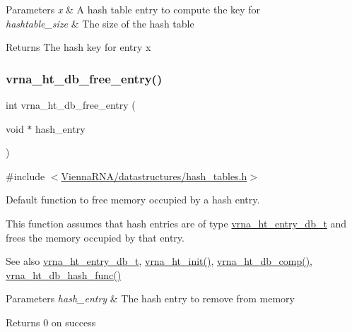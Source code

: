 \begin{DoxyParams}{Parameters}
{\em x} & A hash table entry to compute the key for \\
\hline
{\em hashtable\+\_\+size} & The size of the hash table \\
\hline
\end{DoxyParams}
\begin{DoxyReturn}{Returns}
The hash key for entry {\ttfamily x} 
\end{DoxyReturn}
\mbox{\label{group__hash__table__utils_gabcdcd0d070b3dfd2634a09e7838acf66}} 
\subsubsection{\texorpdfstring{vrna\+\_\+ht\+\_\+db\+\_\+free\+\_\+entry()}{vrna\_ht\_db\_free\_entry()}}
{\footnotesize\ttfamily int vrna\+\_\+ht\+\_\+db\+\_\+free\+\_\+entry (\begin{DoxyParamCaption}\item[{void $\ast$}]{hash\+\_\+entry }\end{DoxyParamCaption})}



{\ttfamily \#include $<$\hyperlink{hash__tables_8h}{Vienna\+R\+N\+A/datastructures/hash\+\_\+tables.\+h}$>$}



Default function to free memory occupied by a hash entry. 

This function assumes that hash entries are of type \hyperlink{group__hash__table__utils_structvrna__ht__entry__db__t}{vrna\+\_\+ht\+\_\+entry\+\_\+db\+\_\+t} and free\textquotesingle{}s the memory occupied by that entry.

\begin{DoxySeeAlso}{See also}
\hyperlink{group__hash__table__utils_structvrna__ht__entry__db__t}{vrna\+\_\+ht\+\_\+entry\+\_\+db\+\_\+t}, \hyperlink{group__hash__table__utils_ga37d1c7e13087a2b7c1b87fda34577c29}{vrna\+\_\+ht\+\_\+init()}, \hyperlink{group__hash__table__utils_gac4ec0b8372d50d7347a63f140f340962}{vrna\+\_\+ht\+\_\+db\+\_\+comp()}, \hyperlink{group__hash__table__utils_gad133721a3cd2f8ca259fe315d86035a7}{vrna\+\_\+ht\+\_\+db\+\_\+hash\+\_\+func()}
\end{DoxySeeAlso}

\begin{DoxyParams}{Parameters}
{\em hash\+\_\+entry} & The hash entry to remove from memory \\
\hline
\end{DoxyParams}
\begin{DoxyReturn}{Returns}
0 on success 
\end{DoxyReturn}
